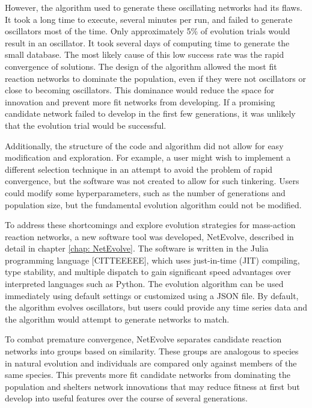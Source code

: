 \documentclass[12pt]{report}
\begin{document}
However, the algorithm used to generate these oscillating networks had its flaws. It took a long time to execute, several minutes per run, and failed to generate oscillators most of the time. Only approximately 5\% of evolution trials would result in an oscillator. It took several days of computing time to generate the small database. The most likely cause of this low success rate was the rapid convergence of solutions. The design of the algorithm allowed the most fit reaction networks to dominate the population, even if they were not oscillators or close to becoming oscillators. This dominance would reduce the space for innovation and prevent more fit networks from developing. If a promising candidate network failed to develop in the first few generations, it was unlikely that the evolution trial would be successful.

Additionally, the structure of the code and algorithm did not allow for easy modification and exploration. For example, a user might wish to implement a different selection technique in an attempt to avoid the problem of rapid convergence, but the software was not created to allow for such tinkering. Users could modify some hyperparameters, such as the number of generations and population size, but the fundamental evolution algorithm could not be modified. 

To address these shortcomings and explore evolution strategies for mass-action reaction networks, a new software tool was developed, NetEvolve, described in detail in chapter \ref{chap: NetEvolve}. The software is written in the Julia programming language [CITTEEEEE], which uses just-in-time (JIT) compiling, type stability, and multiple dispatch to gain significant speed advantages over interpreted languages such as Python. The evolution algorithm can be used immediately using default settings or customized using a JSON file. By default, the algorithm evolves oscillators, but users could provide any time series data and the algorithm would attempt to generate networks to match. 

To combat premature convergence, NetEvolve separates candidate reaction networks into groups based on similarity. These groups are analogous to species in natural evolution and individuals are compared only against members of the same species. This prevents more fit candidate networks from dominating the population and shelters network innovations that may reduce fitness at first but develop into useful features over the course of several generations. 
\end{document}
